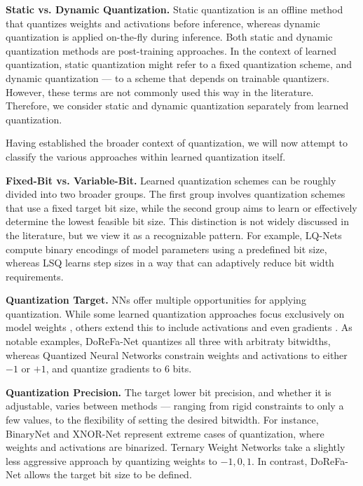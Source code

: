 \textbf{Static vs. Dynamic Quantization.} 
Static quantization is an offline method that quantizes weights and activations before inference, 
whereas dynamic quantization is applied on-the-fly during inference. 
Both static and dynamic quantization methods are post-training approaches. 
In the context of learned quantization, 
static quantization might refer to a fixed quantization scheme, 
and dynamic quantization  — to a scheme 
that depends on trainable quantizers.
However, these terms are not commonly used this way in the literature.
Therefore, we consider static and dynamic quantization separately from learned quantization. 

Having established the broader context of quantization, 
we will now attempt to classify the various approaches within learned quantization itself.

\textbf{Fixed-Bit vs. Variable-Bit.} 
Learned quantization schemes can be roughly divided into two broader groups. 
The first group involves quantization schemes that use a fixed target bit size, 
while the second group aims to learn or effectively determine the lowest feasible bit size. 
This distinction is not widely discussed in the literature, 
but we view it as a recognizable pattern. 
For example, LQ-Nets \cite{DBLP:conf/eccv/ZhangYYH18} compute binary encodings of model parameters using a predefined bit size, 
whereas LSQ \cite{DBLP:conf/iclr/EsserMBAM20} learns step sizes in a way that can adaptively reduce bit width requirements.

\textbf{Quantization Target.} NNs offer multiple opportunities for applying quantization.
While some learned quantization approaches focus exclusively on model weights \cite{polino2018modelcompression} \cite{ott2016rnn} \cite{courbariaux2015binaryconnect} \cite{DBLP:journals/pnas/EsserMACAABMMBN16},
others extend this to include activations \cite{krishnamoorthi2018quantizing} \cite{hubara2016qnn} \cite{rastegari2016xnor} \cite{Edouard2022SPIQ} \cite{DBLP:conf/eccv/ZhangYYH18}
and even gradients \cite{DBLP:journals/corr/LinCMB15} \cite{DBLP:conf/icml/Zhang0KALZ17}. As notable examples,
DoReFa-Net \cite{shuchang2016dorafenet} quantizes all three with arbitraty bitwidths, 
whereas Quantized Neural Networks \cite{hubara2016qnn} constrain weights and activations to either 
\( -1 \) or \( +1 \), and quantize gradients to \( 6 \) bits.

\textbf{Quantization Precision.}
The target lower bit precision, and whether it is adjustable, 
varies between methods — ranging from rigid constraints to only a few values, 
to the flexibility of setting the desired bitwidth. 
For instance, BinaryNet \cite{DBLP:conf/nips/HubaraCSEB16} and XNOR-Net \cite{rastegari2016xnor} 
represent extreme cases of quantization, 
where weights and activations are binarized. 
Ternary Weight Networks \cite{DBLP:conf/icassp/LiuLWZY23} take a slightly less aggressive approach 
by quantizing weights to \( -1, 0, 1 \). 
In contrast, DoReFa-Net \cite{shuchang2016dorafenet} allows the target bit size to be defined.

